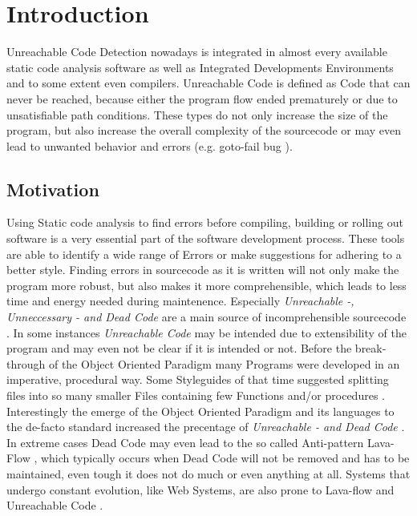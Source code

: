 
\chapter{Introduction}
\label{cha:introduction}

Unreachable Code Detection nowadays is integrated in almost every available static code analysis software as well as Integrated Developments Environments and to some extent even compilers.
Unreachable Code is defined as Code that can never be reached, because either the program flow ended prematurely or due to unsatisfiable path conditions.
These types do not only increase the size of the program, but also increase the overall complexity of the sourcecode or may even lead to unwanted behavior and errors (e.g. goto-fail bug \cite{Boyes_2014}).

\section{Motivation}
\label{sec:motivation}
Using Static code analysis to find errors before compiling, building or rolling out software is a very essential part of the software development process.
These tools are able to identify a wide range of Errors or make suggestions for adhering to a better style.
Finding errors in sourcecode as it is written will not only make the program more robust, but also makes it more comprehensible, which leads to less time and energy needed during maintenence.
Especially \emph{Unreachable -, Unneccessary - and Dead Code} are a main source of incomprehensible sourcecode \cite{Romano_2020}.
In some instances \emph{Unreachable Code} may be intended due to extensibility of the program \cite{Haas_2020} and may even not be clear if it is intended or not.
Before the break-through of the Object Oriented Paradigm many Programs were developed in an imperative, procedural way. Some Styleguides of that time suggested splitting files into so many smaller Files containing few Functions and/or procedures \cite{Srivastava_1992}.
Interestingly the emerge of the Object Oriented Paradigm and its languages to the de-facto standard increased the precentage of \emph{Unreachable - and Dead Code} \cite{Srivastava_1992}.
In extreme cases Dead Code may even lead to the so called Anti-pattern Lava-Flow \cite{Romano_2020}, which typically occurs when Dead Code will not be removed and has to be maintained, even tough it does not do much or even anything at all.
Systems that undergo constant evolution, like Web Systems, are also prone to Lava-flow and Unreachable Code \cite{Boomsma_2012}.

